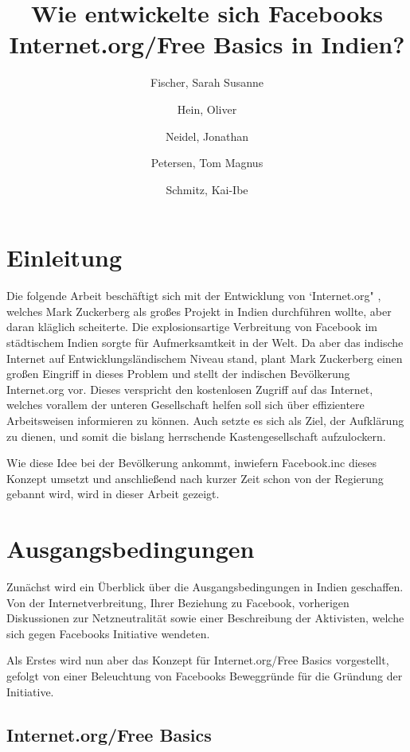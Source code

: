 \documentclass{article}
\title{Wie entwickelte sich Facebooks Internet.org/Free Basics in Indien?}
\author{
  Fischer, Sarah Susanne\\
  \and
  Hein, Oliver\\
  \and
  Neidel, Jonathan\\
  \and
  Petersen, Tom Magnus\\
  \and
  Schmitz, Kai-Ibe\\
}
\begin{document}
\maketitle
\section{Einleitung}

Die folgende Arbeit beschäftigt sich mit der Entwicklung von `Internet.org" , welches Mark Zuckerberg als großes Projekt in Indien durchführen wollte, aber daran kläglich scheiterte.
Die explosionsartige Verbreitung von Facebook im städtischem Indien sorgte für Aufmerksamtkeit in der Welt. Da aber das indische Internet auf Entwicklungsländischem Niveau stand, plant Mark Zuckerberg einen großen Eingriff in dieses Problem und stellt der indischen Bevölkerung Internet.org vor. Dieses verspricht den kostenlosen Zugriff auf das Internet, welches vorallem der unteren Gesellschaft helfen soll sich über effizientere Arbeitsweisen informieren zu können. Auch setzte es sich als Ziel, der Aufklärung zu dienen, und somit die bislang herrschende Kastengesellschaft aufzulockern.


Wie diese Idee bei der Bevölkerung ankommt, inwiefern Facebook.inc dieses Konzept umsetzt und anschließend nach kurzer Zeit schon von der Regierung gebannt wird, wird in dieser Arbeit gezeigt. 





\section{Ausgangsbedingungen}

Zunächst wird ein Überblick über die Ausgangsbedingungen in Indien geschaffen. Von der Internetverbreitung, Ihrer Beziehung zu Facebook, vorherigen Diskussionen zur Netzneutralität sowie einer Beschreibung der Aktivisten, welche sich gegen Facebooks Initiative wendeten.

Als Erstes wird nun aber das Konzept für Internet.org/Free Basics vorgestellt, gefolgt von einer Beleuchtung von Facebooks Beweggründe für die Gründung der Initiative.

\subsection{Internet.org/Free Basics}

\end{document}
